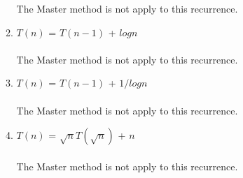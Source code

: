 \documentclass{article}
\begin{document}
\begin{enumerate}
\begin{enumerate}
        The Master method is not apply to this recurrence.\\
        \item $T(n)$ = $T(n-1)$ + $logn$\\\\
        The Master method is not apply to this recurrence.\\
        \item $T(n)$ = $T(n-1)$ + $1/logn$\\\\
        The Master method is not apply to this recurrence.\\
        \item $T(n)$ = $\sqrt{n}T(\sqrt{n})$ + $n$\\\\
        The Master method is not apply to this recurrence.\\
    \end{enumerate}
\end{enumerate}    
\end{document}
